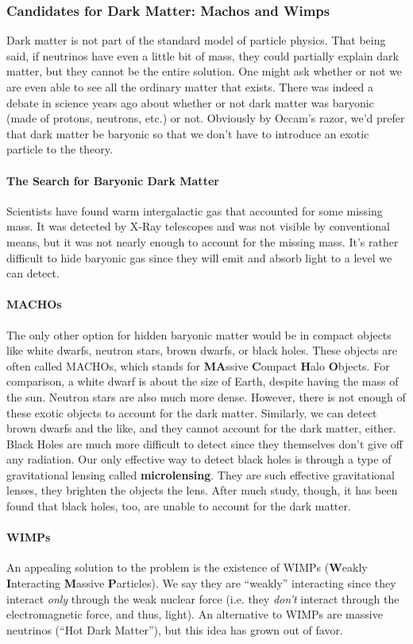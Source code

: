 \documentclass{article}
\begin{document}
	\subsubsection{Candidates for Dark Matter: Machos and Wimps}
	Dark matter is not part of the standard model of particle physics. That being said, if neutrinos have even a little bit of mass, they could partially explain dark matter, but they cannot be the entire solution. One might ask whether or not we are even able to see all the ordinary matter that exists. There was indeed a debate in science years ago about whether or not dark matter was baryonic (made of protons, neutrons, etc.) or not. Obviously by Occam's razor, we'd prefer that dark matter be baryonic so that we don't have to introduce an exotic particle to the theory.
	\paragraph{The Search for Baryonic Dark Matter} Scientists have found warm intergalactic gas that accounted for some missing mass. It was detected by X-Ray telescopes and was not visible by conventional means, but it was not nearly enough to account for the missing mass. It's rather difficult to hide baryonic gas since they will emit and absorb light to a level we can detect. 
	\paragraph{MACHOs} The only other option for hidden baryonic matter would be in compact objects like white dwarfs, neutron stars, brown dwarfs, or black holes. These objects are often called MACHOs, which stands for \textbf{M}\textbf{A}ssive \textbf{C}ompact \textbf{H}alo \textbf{O}bjects. For comparison, a white dwarf is about the size of Earth, despite having the mass of the sun. Neutron stars are also much more dense. However, there is not enough of these exotic objects to account for the dark matter. Similarly, we can detect brown dwarfs and the like, and they cannot account for the dark matter, either. Black Holes are much more difficult to detect since they themselves don't give off any radiation. Our only effective way to detect black holes is through a type of gravitational lensing called \textbf{microlensing}. They are such effective gravitational lenses, they brighten the objects the lens. After much study, though, it has been found that black holes, too, are unable to account for the dark matter.
	\paragraph{WIMPs} An appealing solution to the problem is the existence of WIMPs (\textbf{W}eakly \textbf{I}nteracting \textbf{M}assive \textbf{P}articles). We say they are ``weakly'' interacting since they interact \emph{only} through the weak nuclear force (i.e. they \emph{don't} interact through the electromagnetic force, and thus, light). An alternative to WIMPs are massive neutrinos (``Hot Dark Matter''), but this idea has grown out of favor.\\
	
\end{document}
